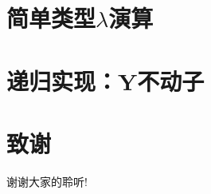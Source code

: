 \documentclass[CJKutf8,compress,hyperref]{beamer}
\begin{document}
\begin{CJK}{UTF8}{song}
\section{简单类型$\lambda$演算} 
\section{递归实现：Y不动子} 

\section{致谢}
\begin{frame}
  \begin{Huge}
    \begin{center}
      谢谢大家的聆听!
    \end{center}
  \end{Huge}
\end{frame}
\end{CJK}
\end{document}
